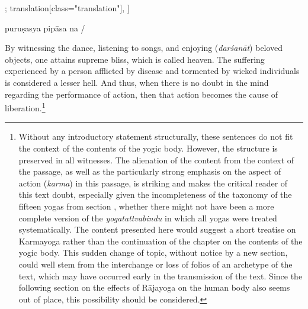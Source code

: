 \begin{alignment}[
  texts=edition[class="edition"];
  translation[class="translation"],
  ]
\begin{edition}
\begin{prose}[p42_01]
puruṣasya
pipāsa
na
/
    \end{prose}
  \end{edition}
  \begin{translation}
    \begin{tlate}[p41_03]
      \noindent
      By witnessing the dance, listening to songs, and enjoying (\textit{darśanāt}) beloved objects, one attains supreme bliss, which is called heaven. The suffering experienced by a person afflicted by disease and tormented by wicked individuals is considered a lesser hell.
And thus, when there is no doubt in the mind regarding the performance of action, then that action becomes the cause of liberation.\footnote{Without any introductory statement structurally, these sentences do not fit the context of the contents of the yogic body. However, the structure is preserved in all witnesses. The alienation of the content from the context of the passage, as well as the particularly strong emphasis on the aspect of action (\textit{karma}) in this passage, is striking and makes the critical reader of this text doubt, especially given the incompleteness of the taxonomy of the fifteen yogas from section , whether there might not have been a more complete version of the \textit{yogatattvabindu} in which all yogas were treated systematically. The content presented here would suggest a short treatise on Karmayoga rather than the continuation of the chapter on the contents of the yogic body. This sudden change of topic, without notice by a new section, could well stem from the interchange or loss of folios of an archetype of the text, which may have occurred early in the transmission of the text. Since the following section on the effects of Rājayoga on the human body also seems out of place, this possibility should be considered.} 
\end{tlate}
\ekddiv{
}
\end{translation}
\end{alignment}
